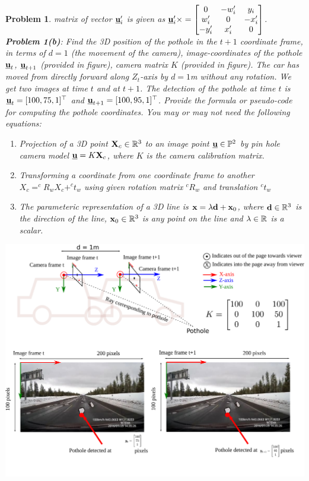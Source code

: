 \documentclass{article}
\newtheorem{prob}{Problem}
\begin{document}
\begin{prob}
    matrix of vector $\underline{\mathbf{u}}'_i$ is given as $\underline{\mathbf{u}}'_i \times = \begin{bmatrix}
      0 & -w'_i & y_i \\
      w'_i & 0 & -x'_i \\
      -y'_i &  x'_i & 0
      \end{bmatrix}$.
  \newpage
  \textbf{Problem 1(b)}:
  Find the 3D position of the
  pothole in the $t+1$ coordinate frame, in terms of $d = 1$ (the movement of the camera),
  image-coordinates of the pothole $\underline{\mathbf{u}}_t$, $\underline{\mathbf{u}}_{t+1}$ (provided in figure), camera matrix $K$ (provided in figure).
  The car has moved from directly forward along $Z_t$-axis by $d=1$m without any rotation.
  We get two images at time $t$ and at $t+1$. The detection of the pothole at
  time $t$ is $\underline{\mathbf{u}}_t = [100, 75, 1]^\top$ and
  $\underline{\mathbf{u}}_{t+1} = [100, 95, 1]^\top$.
  Provide the formula or pseudo-code for computing the
  pothole coordinates.  You may or may not need the following equations:
  \begin{enumerate}
    \item Projection of a 3D point $\mathbf{X}_c \in \mathbb{R}^3$ to an image point $\underline{\mathbf{u}}
      \in \mathbb{P}^2$ by pin hole camera model $\underline{\mathbf{u}} = K\mathbf{X}_c$, where $K$ is the
      camera calibration matrix.
    \item Transforming a coordinate from one coordinate frame to another $X_c =
      ^cR_w X_c  + ^ct_w$ using given rotation matrix $^cR_w$ and translation $^ct_w$ 
    \item The parameteric representation of a 3D line is $\mathbf{x} = \lambda \mathbf{d} + \mathbf{x}_0$,
      where $\mathbf{d} \in \mathbb{R}^3$ is the direction of the line, $\mathbf{x}_0 \in \mathbb{R}^3$
      is any point on the line and $\lambda \in \mathbb{R}$ is a scalar.
    \end{enumerate}
  \includegraphics[width=0.7\linewidth]{media/image-road-triangulation-ray-ray.pdf}
\end{prob}
\end{document}
